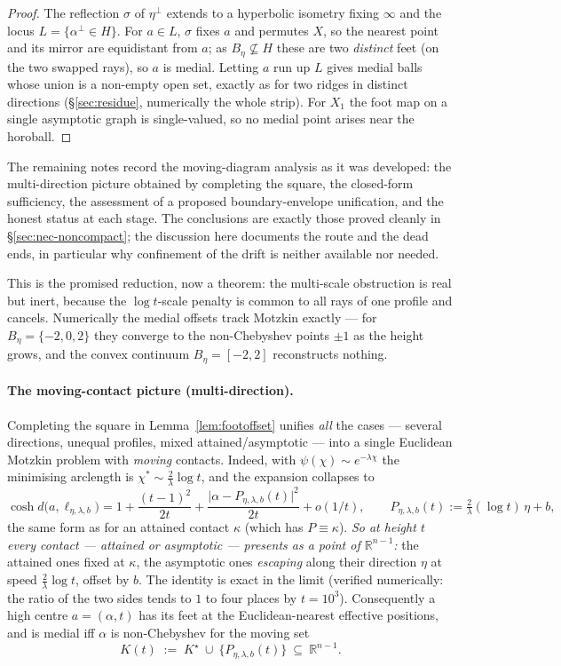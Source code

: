 \documentclass[11pt]{article}
\theoremstyle{remark}
\newcommand{\R}{\mathbb{R}}
\newcommand{\X}{X}
\begin{document}
\begin{proof}
The reflection $\sigma$ of $\eta^{\perp}$ extends to a hyperbolic
isometry fixing $\infty$ and the locus $L=\{\alpha^{\perp}\in H\}$. For
$a\in L$, $\sigma$ fixes $a$ and permutes $\X$, so the nearest point
and its mirror are equidistant from $a$; as $B_{\eta}\not\subseteq H$
these are two \emph{distinct} feet (on the two swapped rays), so $a$ is
medial. Letting $a$ run up $L$ gives medial balls whose union is a
non-empty open set, exactly as for two ridges in distinct directions
(\S\ref{sec:residue}, numerically the whole strip). For $\X_{1}$ the
foot map on a single asymptotic graph is single-valued, so no medial
point arises near the horoball.
\end{proof}

The remaining notes record the moving-diagram
analysis as it was developed: the multi-direction picture obtained by
completing the square, the closed-form sufficiency, the assessment of a
proposed boundary-envelope unification, and the honest status at each
stage. The conclusions are exactly those proved cleanly in
\S\ref{sec:nec-noncompact}; the discussion here documents the route and
the dead ends, in particular why confinement of the drift is neither
available nor needed.

This is the promised reduction, now a theorem: the multi-scale obstruction
is real but inert, because the $\log t$-scale penalty is common to all
rays of one profile and cancels. Numerically the medial offsets track
Motzkin exactly --- for $B_{\eta}=\{-2,0,2\}$ they converge to the
non-Chebyshev points $\pm1$ as the height grows, and the convex
continuum $B_{\eta}=[-2,2]$ reconstructs nothing.

\paragraph{The moving-contact picture (multi-direction).}
Completing the square in Lemma~\ref{lem:footoffset} unifies \emph{all}
the cases --- several directions, unequal profiles, mixed
attained/asymptotic --- into a single Euclidean Motzkin problem with
\emph{moving} contacts. Indeed, with $\psi(\chi)\sim e^{-\lambda\chi}$
the minimising arclength is $\chi^{\ast}\sim\frac{2}{\lambda}\log t$,
and the expansion collapses to
\[
\cosh d\bigl(a,\ell_{\eta,\lambda,b}\bigr)
=1+\frac{(t-1)^{2}}{2t}+\frac{\bigl\lvert\alpha-P_{\eta,\lambda,b}(t)
\bigr\rvert^{2}}{2t}+o(1/t),\qquad
P_{\eta,\lambda,b}(t):=\tfrac{2}{\lambda}(\log t)\,\eta+b ,
\]
the same form as for an attained contact $\kappa$ (which has
$P\equiv\kappa$). \emph{So at height $t$ every contact --- attained or
asymptotic --- presents as a point of $\R^{n-1}$:} the attained ones
fixed at $\kappa$, the asymptotic ones \emph{escaping} along their
direction $\eta$ at speed $\tfrac{2}{\lambda}\log t$, offset by $b$.
The identity is exact in the limit (verified numerically: the ratio of
the two sides tends to $1$ to four places by $t=10^{3}$). Consequently
a high centre $a=(\alpha,t)$ has its feet at the Euclidean-nearest
effective positions, and is medial iff $\alpha$ is non-Chebyshev for
the moving set
\[
K(t)\;:=\;K^{\star}\ \cup\ \bigl\{P_{\eta,\lambda,b}(t)\bigr\}
\ \subseteq\ \R^{n-1}.
\]
\end{document}
